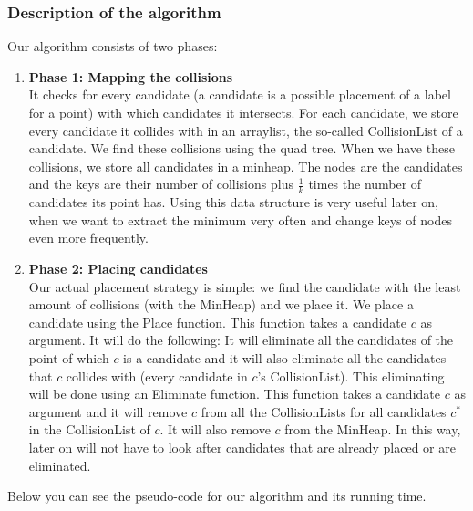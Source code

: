 \documentclass[crop=false,a4paper,oneside,11pt]{article}
\begin{document}
\subsubsection{Description of the algorithm}
Our algorithm consists of two phases:
\begin{enumerate}
\item \textbf{Phase 1: Mapping the collisions}\\
It checks for every candidate (a candidate is a possible placement of a label for a point) with which candidates it intersects. For each candidate, we store every candidate it collides with in an arraylist, the so-called CollisionList of a candidate. We find these collisions using the quad tree. When we have these collisions, we store all candidates in a minheap. The nodes are the candidates and the keys are their number of collisions plus $\frac{1}{k}$ times the number of candidates its point has. Using this data structure is very useful later on, when we want to extract the minimum very often and change keys of nodes even more frequently.
\item \textbf{Phase 2: Placing candidates}\\
Our actual placement strategy is simple: we find the candidate with the least amount of collisions (with the MinHeap) and we place it. We place a candidate using the Place function. This function takes a candidate $c$ as argument. It will do the following: It will eliminate all the candidates of the point of which $c$ is a candidate and it will also eliminate all the candidates that $c$ collides with (every candidate in $c$'s CollisionList). This eliminating will be done using an Eliminate function. This function takes a candidate $c$ as argument and it will remove $c$ from all the CollisionLists for all candidates $c^*$ in the CollisionList of $c$. It will also remove $c$ from the MinHeap. In this way, later on will not have to look after candidates that are already placed or are eliminated. 
\end{enumerate}
Below you can see the pseudo-code for our algorithm and its running time.
\end{document}
